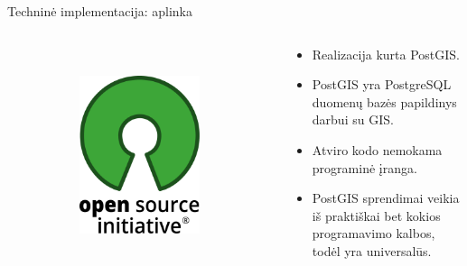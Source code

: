 \documentclass[14pt]{beamer}
\begin{document}
\begin{frame}{Techninė implementacija: aplinka}
\begin{columns}[c]
\begin{column}{.3\textwidth}
\begin{figure}[ht]
\begin{subfigure}[b]{\textwidth}
        \end{subfigure}
        \\[1ex]
        \begin{subfigure}[b]{\textwidth}
          \centering
          \includegraphics[width=.6\textwidth]{osi-logo}
        \end{subfigure}
      \end{figure}
    \end{column}
    \begin{column}{.7\textwidth}

      \begin{itemize}[<+->]
        \item Realizacija kurta PostGIS.

        \item PostGIS yra PostgreSQL duomenų bazės papildinys darbui su GIS.

        \item Atviro kodo nemokama programinė įranga.

        \item PostGIS sprendimai veikia iš praktiškai bet kokios programavimo
          kalbos, todėl yra universalūs.

      \end{itemize}

    \end{column}
  \end{columns}
\end{frame}
\end{document}
